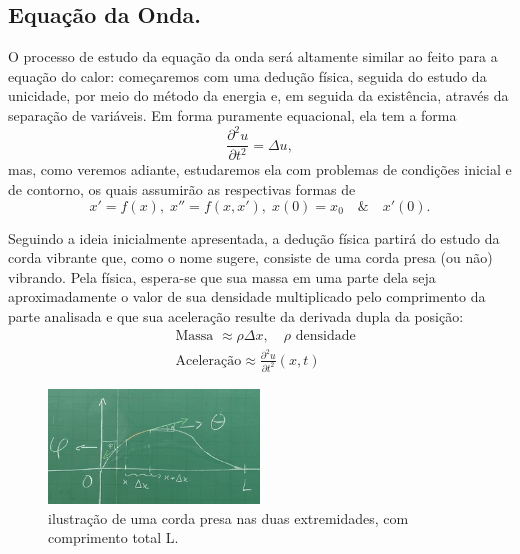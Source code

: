 \documentclass[../pde_notes.tex]{subfiles}
\begin{document}
\subsection{Equação da Onda.}
O processo de estudo da equação da onda será altamente similar ao feito para a equação do calor: começaremos com uma dedução física, seguida do estudo da unicidade, por meio do método da energia e, em seguida da existência, através da separação de variáveis. Em forma puramente equacional, ela tem a forma
\[
	\frac{\partial^{2}u}{\partial t^{2}} = \Delta u,
\]
mas, como veremos adiante, estudaremos ela com problemas de condições inicial e de contorno, os quais assumirão as respectivas formas de
\[
	x' = f(x),\; x'' = f(x, x'), \;x(0) = x_{0} \quad\&\quad x'(0).
\]

Seguindo a ideia inicialmente apresentada, a dedução física partirá do estudo da corda vibrante que, como o nome sugere, consiste de uma corda presa (ou não) vibrando. Pela física, espera-se que sua massa em uma parte dela seja aproximadamente o valor de sua densidade multiplicado pelo comprimento da parte analisada e que sua aceleração resulte da derivada dupla da posição:
\begin{align*}
	 & \text{Massa }\approx \rho \Delta x,\quad \rho \text{ densidade}     \\
	 & \text{Aceleração}\approx \frac{\partial^{2}u}{\partial t^{2}}(x, t)
\end{align*}

\begin{figure}[H]
	\begin{center}
		\includegraphics[height=0.5\textheight, width=0.5\textwidth, keepaspectratio]{./Images/vibrating_string_11.png}
	\end{center}
	\caption{ilustração de uma corda presa nas duas extremidades, com comprimento total L.}
	\label{vibestring11}
\end{figure}
\end{document}
